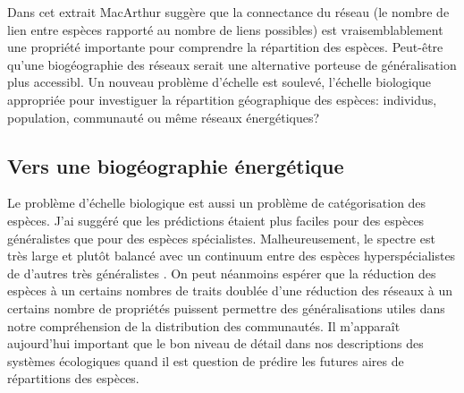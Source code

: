 Dans cet extrait MacArthur suggère que la connectance du réseau (le
nombre de lien entre espèces rapporté au nombre de liens possibles) est
vraisemblablement une propriété importante pour comprendre la
répartition des espèces. Peut-être qu'une biogéographie des réseaux
serait une alternative porteuse de généralisation plus accessibl. Un
nouveau problème d'échelle est soulevé, l'échelle biologique appropriée
pour investiguer la répartition géographique des espèces: individus,
population, communauté ou même réseaux énergétiques?

\subsection*{Vers une biogéographie
énergétique}\label{vers-une-bioguxe9ographie-uxe9nerguxe9tique}

Le problème d'échelle biologique est aussi un problème de catégorisation
des espèces. J'ai suggéré que les prédictions étaient plus faciles pour
des espèces généralistes que pour des espèces spécialistes.
Malheureusement, le spectre est très large et plutôt balancé avec un
continuum entre des espèces hyperspécialistes de d'autres très
généralistes \citep{Poisot2015c}. On peut néanmoins espérer que la
réduction des espèces à un certains nombres de traits
\citep{McGill2006, Poisot2015} doublée d'une réduction des réseaux à un
certains nombre de propriétés puissent permettre des généralisations
utiles dans notre compréhension de la distribution des communautés. Il
m'apparaît aujourd'hui important que le bon niveau de détail dans nos
descriptions des systèmes écologiques quand il est question de prédire
les futures aires de répartitions des espèces.

